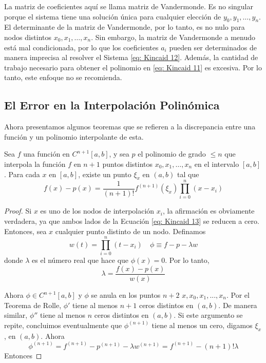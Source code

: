 La matriz de coeficientes aquí se llama matriz de Vandermonde. Es no singular porque el sistema tiene una solución única para cualquier elección de \( y_0, y_1, \dots, y_n \). El determinante de la matriz de Vandermonde, por lo tanto, es no nulo para nodos distintos \( x_0, x_1, \dots, x_n \). Sin embargo, la matriz de Vandermonde a menudo está mal condicionada, por lo que los coeficientes \( a_i \) pueden ser determinados de manera imprecisa al resolver el Sistema \ref{eq: Kincaid 12}. Además, la cantidad de trabajo necesario para obtener el polinomio en \ref{eq: Kincaid 11} es excesiva. Por lo tanto, este enfoque no se recomienda.

\subsection{El Error en la Interpolación Polinómica}
Ahora presentamos algunos teoremas que se refieren a la discrepancia entre una función y un polinomio interpolante de esta.
\begin{theorem}
\label{teo: Kincaid 2}
Sea \( f \) una función en \( C^{n + 1}[a, b] \), y sea \( p \) el polinomio de grado \(\leq n\) que interpola la función \( f \) en \( n + 1 \) puntos distintos \( x_0, x_1, \ldots, x_n \) en el intervalo \([a, b]\). Para cada \( x \) en \([a, b]\), existe un punto \( \xi_x \) en \((a, b)\) tal que
\begin{equation}
    \label{eq: Kincaid 13}
    f(x) - p(x) = \frac{1}{(n + 1)!} f^{(n + 1)} (\xi_x) \prod_{i = 0}^{n} (x - x_i)
\end{equation}
\end{theorem}

\begin{proof}
Si \( x \) es uno de los nodos de interpolación \( x_i \), la afirmación es obviamente verdadera, ya que ambos lados de la Ecuación \ref{eq: Kincaid 13} se reducen a cero. Entonces, sea \( x \) cualquier punto distinto de un nodo. Definamos
\[ w(t) = \prod_{i = 0}^{n} (t - x_i) \quad \phi \equiv f - p - \lambda w \]
donde \( \lambda \) es el número real que hace que \( \phi(x) = 0 \). Por lo tanto,
\[ \lambda = \frac{f(x) - p(x)}{w(x)} \]

Ahora $\phi \in C^{n + 1} [a, b]$ y $\phi$ se anula en los puntos $n + 2$ $x, x_0, x_1,...,x_n$. Por el Teorema de Rolle, $\phi'$ tiene al menos $n + 1$ ceros distintos en $(a, b)$. De manera similar, $\phi''$ tiene al menos $n$ ceros distintos en $(a, b)$. Si este argumento se repite, concluimos eventualmente que $\phi^{(n + 1)}$ tiene al menos un cero, digamos $\xi_x$, en $(a, b)$. Ahora
\[ \phi^{(n + 1)} = f^{(n + 1)} - p^{(n + 1)} - \lambda w^{(n + 1)} = f^{(n + 1)} - (n + 1)! \lambda\]
Entonces

\noindent {}
\end{proof}


